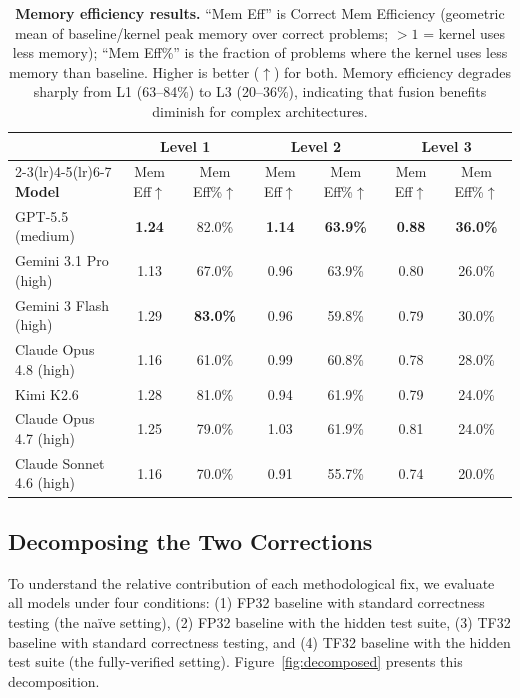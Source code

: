\documentclass[]{fairmeta}
\newcommand{\best}[1]{\textbf{#1}}
\begin{document}
\begin{table}[H]
\centering
\caption{\textbf{Memory efficiency results.} ``Mem Eff'' is Correct Mem Efficiency (geometric mean of baseline/kernel peak memory over correct problems; $>1$ = kernel uses less memory); ``Mem Eff\%'' is the fraction of problems where the kernel uses less memory than baseline. Higher is better ($\uparrow$) for both. Memory efficiency degrades sharply from L1 (63--84\%) to L3 (20--36\%), indicating that fusion benefits diminish for complex architectures.}
\label{tab:memory}\small
\begin{tabular}{l cc cc cc}
\toprule
& \multicolumn{2}{c}{\textbf{Level 1}} & \multicolumn{2}{c}{\textbf{Level 2}} & \multicolumn{2}{c}{\textbf{Level 3}} \\
\cmidrule(lr){2-3}\cmidrule(lr){4-5}\cmidrule(lr){6-7}
\textbf{Model} & Mem Eff$\uparrow$ & Mem Eff\%$\uparrow$ & Mem Eff$\uparrow$ & Mem Eff\%$\uparrow$ & Mem Eff$\uparrow$ & Mem Eff\%$\uparrow$ \\
\midrule
GPT-5.5 (medium)           & \best{1.24} & 82.0\% & \best{1.14} & \best{63.9\%} & \best{0.88} & \best{36.0\%} \\
Gemini 3.1 Pro (high)      & 1.13 & 67.0\% & 0.96 & 63.9\% & 0.80 & 26.0\% \\
Gemini 3 Flash (high)      & 1.29 & \best{83.0\%} & 0.96 & 59.8\% & 0.79 & 30.0\% \\
Claude Opus 4.8 (high)     & 1.16 & 61.0\% & 0.99 & 60.8\% & 0.78 & 28.0\% \\
Kimi K2.6                  & 1.28 & 81.0\% & 0.94 & 61.9\% & 0.79 & 24.0\% \\
Claude Opus 4.7 (high)     & 1.25 & 79.0\% & 1.03 & 61.9\% & 0.81 & 24.0\% \\
Claude Sonnet 4.6 (high)   & 1.16 & 70.0\% & 0.91 & 55.7\% & 0.74 & 20.0\% \\
\bottomrule
\end{tabular}
\end{table}



\subsection{Decomposing the Two Corrections}
\label{sec:decomp}

To understand the relative contribution of each methodological fix, we evaluate all models under four conditions: (1) FP32 baseline with standard correctness testing (the na\"ive setting), (2) FP32 baseline with the hidden test suite, (3) TF32 baseline with standard correctness testing, and (4) TF32 baseline with the hidden test suite (the fully-verified setting). Figure~\ref{fig:decomposed} presents this decomposition.
\end{document}
